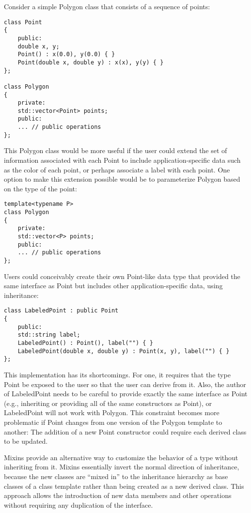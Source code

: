 
Consider a simple Polygon class that consists of a sequence of points:

\begin{lstlisting}[style=styleCXX]
class Point
{
	public:
	double x, y;
	Point() : x(0.0), y(0.0) { }
	Point(double x, double y) : x(x), y(y) { }
};

class Polygon
{
	private:
	std::vector<Point> points;
	public:
	... // public operations
};
\end{lstlisting}

This Polygon class would be more useful if the user could extend the set of information associated with each Point to include application-specific data such as the color of each point, or perhaps associate a label with each point. One option to make this extension possible would be to parameterize Polygon based on the type of the point:

\begin{lstlisting}[style=styleCXX]
template<typename P>
class Polygon
{
	private:
	std::vector<P> points;
	public:
	... // public operations
};
\end{lstlisting}

Users could conceivably create their own Point-like data type that provided the same interface as Point but includes other application-specific data, using inheritance:

\begin{lstlisting}[style=styleCXX]
class LabeledPoint : public Point
{
	public:
	std::string label;
	LabeledPoint() : Point(), label("") { }
	LabeledPoint(double x, double y) : Point(x, y), label("") { }
};
\end{lstlisting}

This implementation has its shortcomings. For one, it requires that the type Point be exposed to the user so that the user can derive from it. Also, the author of LabeledPoint needs to be careful to provide exactly the same interface as Point (e.g., inheriting or providing all of the same constructors as Point), or LabeledPoint will not work with Polygon. This constraint becomes more problematic if Point changes from one version of the Polygon template to another: The addition of a new Point constructor could require each derived class to be updated.

Mixins provide an alternative way to customize the behavior of a type without inheriting from it. Mixins essentially invert the normal direction of inheritance, because the new classes are “mixed in” to the inheritance hierarchy as base classes of a class template rather than being created as a new derived class. This approach allows the introduction of new data members and other operations without requiring any duplication of the interface.

